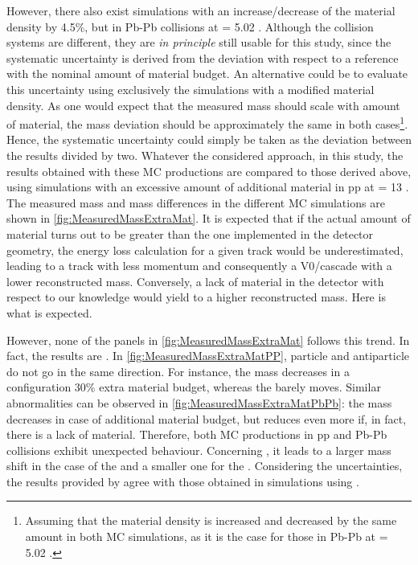 However, there also exist simulations with an increase/decrease of the material density by 4.5\%, but in Pb-Pb collisions at \sqrtSnn = 5.02 \tev. Although the collision systems are different, they are \textit{in principle} still usable for this study, since the systematic uncertainty is derived from the deviation with respect to a reference with the nominal amount of material budget. An alternative could be to evaluate this uncertainty using exclusively the simulations with a modified material density. As one would expect that the measured mass should scale with amount of material, the mass deviation should be approximately the same in both cases\footnote{Assuming that the material density is increased and decreased by the same amount in both MC simulations, as it is the case for those in Pb-Pb at \sqrtSnn = 5.02 \tev.}. Hence, the systematic uncertainty could simply be taken as the deviation between the results divided by two. Whatever the considered approach, in this study, the results obtained with these MC productions are compared to those derived above, \ie using simulations with an excessive amount of additional material in pp at \sqrtS = 13 \tev.\\

The measured mass and mass differences in the different MC simulations are shown in \fig\ref{fig:MeasuredMassExtraMat}. It is expected that if the actual amount of material turns out to be greater than the one implemented in the detector geometry, the energy loss calculation for a given track would be underestimated, leading to a track with less momentum and consequently a V0/cascade with a lower reconstructed mass. Conversely, a lack of material in the detector with respect to our knowledge would yield to a higher reconstructed mass. Here is what is expected.

However, none of the panels in \figs\ref{fig:MeasuredMassExtraMat} follows this trend. In fact, the results are . In \fig\ref{fig:MeasuredMassExtraMatPP}, particle and antiparticle do not go in the same direction. For instance, the \rmAomegaP mass decreases in a configuration 30\% extra material budget, whereas the \rmOmegaM barely moves. Similar abnormalities can be observed in \fig\ref{fig:MeasuredMassExtraMatPbPb}: the \rmKzeroS mass decreases in case of additional material budget, but reduces even more if, in fact, there is a lack of material. Therefore, both MC productions in pp and Pb-Pb collisions exhibit unexpected behaviour. Concerning \GeantThree, it leads to a larger mass shift in the case of the \rmLambda and a smaller one for the \rmKzeroS. Considering the uncertainties, the results provided by \GeantThree agree with those obtained in simulations using \GeantFour.

